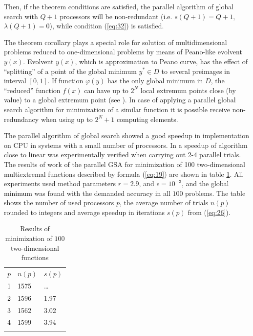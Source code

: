 \documentclass[smallcondensed]{svjour3}     %
\begin{document}
Then, if the theorem conditions are satisfied, the parallel algorithm of global search with $Q+1$ processors will be non-redundant (i.e. $s(Q+1)= Q+1$, \mbox{$\lambda(Q+1)=0$}), while condition (\ref{eq:32}) is satisfied.

The theorem corollary plays a special role for solution of multidimensional problems reduced to one-dimensional problems by means of Peano-like evolvent $y(x)$. Evolvent $y(x)$, which is approximation to Peano curve, has the effect of ``splitting'' of a point of the global minimum $y^\ast\in D$ to several preimages in interval $[0,1]$. If function $\varphi(y)$ has the only global minimum in $D$, the ``reduced'' function $f(x)$ can have up to $2^N$ local extremum points close (by value) to a global extremum point (see \cite{RefStrongin2000}). In case of applying a parallel global search algorithm for minimization of a similar function it is possible receive non-redundancy when using up to $2^N+1$ computing elements.

The parallel algorithm of global search showed a good speedup in implementation on CPU in systems with a small number of processors. In \cite{RefGrishagin1997,RefStrongin2003} a speedup of algorithm close to linear was experimentally verified when carrying out 2-4 parallel trials. The results of work of the parallel GSA for minimization of 100 two-dimensional multiextremal functions described by formula (\ref{eq:19}) are shown in table \ref{tab:1}. All experiments used method parameters $r=2.9$, and $\epsilon=10^{-3}$, and the global minimum was found with the demanded accuracy in all $100$ problems. The table shows the number of used processors $p$, the average number of trials $n(p)$ rounded to integers and average speedup in iterations $s(p)$ from (\ref{eq:26}). 

\begin{table}
	\caption{Results of minimization of $100$ two-dimensional functions}
	\label{tab:1}
	\center
	\begin{tabular}{lll}
		\hline\noalign{\smallskip}
		 $p$ & $n(p)$ & $s(p)$ \\
		\noalign{\smallskip} \hline \noalign{\smallskip}
			1 &	1575 &	\dots \\
			2 &	1596 &	1.97 \\
			3 &	1562 &	3.02 \\
			4 &	1599 &	3.94 \\
		\noalign{\smallskip}\hline
	\end{tabular}
\end{table}
\end{document}
